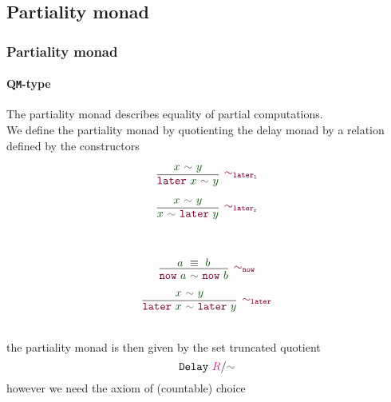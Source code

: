 \documentclass[xelatex,mathserif,serif,notheorems]{beamer} %
\theoremstyle{plain} %
\theoremstyle{definition}
\theoremstyle{remark}
\newcommand*{\term}[1]{\textcolor{green!30!black}{#1}} %
\newcommand*{\type}[1]{\textcolor{magenta!90!black}{#1}}
\newcommand*{\relation}[1]{\textcolor{gray!75!black}{\ensuremath{\mathtt{#1}}}}
\newcommand*{\constructor}[1]{\textcolor{purple!60!black}{\ensuremath{\mathtt{#1}}}}
\newcommand*{\typeformer}[1]{\ensuremath{\mathtt{#1}}}
\begin{document}
\subsection{Partiality monad}
\begin{frame}
  \frametitle{Partiality monad}
  \framesubtitle{Q\texttt{M}-type}
  The partiality monad describes equality of partial computations.
  \pause
  \\[3mm]
  We define the partiality monad by quotienting the delay monad by a relation defined by the constructors
  \\
  \strut
  \hfill
  \begin{minipage}{0.4\linewidth}
    \begin{equation}
      \vcenter{\infer[{\constructor{\sim_{later_l}}}]{\constructor{later}~\term{x}~\relation{\sim}~\term{y}}{\term{x}~\relation{\sim}~\term{y}}}
    \end{equation}
  \end{minipage}
  \hfill
    \begin{minipage}{0.4\linewidth}
    \begin{equation}
      \vcenter{\infer[{\constructor{\sim_{later_r}}}]{\term{x}~\relation{\sim}~\constructor{later}~\term{y}}{\term{x}~\relation{\sim}~\term{y}}}
    \end{equation}
  \end{minipage}
  \hfill
  \strut
  \\
  \strut
  \hfill
  \begin{minipage}{0.4\linewidth}
    \begin{equation}
      \vcenter{\infer[{\constructor{\sim_{now}}}]{\constructor{now}~\term{a}~\relation{\sim}~\constructor{now}~\term{b}}{\term{a}~\equiv~\term{b}}}
    \end{equation}
  \end{minipage}
  \hfill
  \begin{minipage}{0.5\linewidth}
    \begin{equation}
      \vcenter{\infer[{\constructor{\sim_{later}}}]{\constructor{later}~\term{x}~\relation{\sim}~\constructor{later}~\term{y}}{\term{x}~\relation{\sim}~\term{y}}}
    \end{equation}
  \end{minipage}
  \hfill
  \strut
  \\[5mm]
  the partiality monad is then given by the set truncated quotient
  \begin{equation}
    \typeformer{Delay}~\type{R}/\relation{\sim}
  \end{equation}
  however we need the axiom of (countable) choice
\end{frame}
\end{document}
